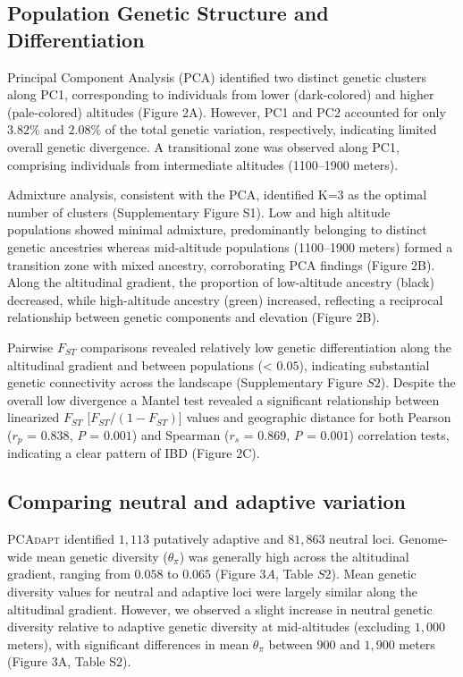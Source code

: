 \documentclass[9pt,a4paper,twoside]{rho-class/rho}
\begin{document}
    \subsection{Population Genetic Structure and Differentiation}

        Principal Component Analysis (PCA) identified two distinct genetic clusters along PC1, corresponding to individuals from lower (dark-colored) and higher (pale-colored) altitudes (Figure 2A). However, PC1 and PC2 accounted for only $3.82\%$ and $2.08\%$ of the total genetic variation, respectively, indicating limited overall genetic divergence. A transitional zone was observed along PC1, comprising individuals from intermediate altitudes (1100–1900 meters).
        
        Admixture analysis, consistent with the PCA, identified K=3 as the optimal number of clusters (Supplementary Figure S1). Low and high altitude populations showed minimal admixture, predominantly belonging to distinct genetic ancestries whereas mid-altitude populations (1100–1900 meters) formed a transition zone with mixed ancestry, corroborating PCA findings (Figure 2B). Along the altitudinal gradient, the proportion of low-altitude ancestry (black) decreased, while high-altitude ancestry (green) increased, reflecting a reciprocal relationship between genetic components and elevation (Figure 2B).

        Pairwise $F_{ST}$ comparisons revealed relatively low genetic differentiation along the altitudinal gradient and between populations (< $0.05$), indicating substantial genetic connectivity across the landscape (Supplementary Figure $S2$). Despite the overall low divergence a Mantel test revealed a significant relationship between linearized $F_{ST}$  [$F_{ST}/(1 - F_{ST})$] values and geographic distance for both Pearson (\textit{$r_p$} = $0.838$, \textit{P} = $0.001$) and Spearman (\textit{$r_s$} = $0.869$, \textit{P} = $0.001$) correlation tests, indicating a clear pattern of IBD (Figure 2C).

    \subsection{Comparing neutral and adaptive variation}

        \textsc{PCAdapt} identified $1,113$ putatively adaptive and $81,863$ neutral loci. Genome-wide mean genetic diversity ($\theta_\pi$) was generally high across the altitudinal gradient, ranging from $0.058$ to $0.065$ (Figure $3A$, Table $S2$). Mean genetic diversity values for neutral and adaptive loci were largely similar along the altitudinal gradient. However, we observed a slight increase in neutral genetic diversity relative to adaptive genetic diversity at mid-altitudes (excluding $1,000$ meters), with significant differences in mean $\theta_\pi$ between $900$ and $1,900$ meters (Figure 3A, Table S2).
    
\end{document}
